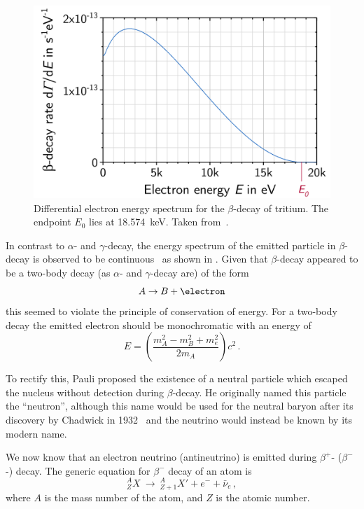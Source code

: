 \begin{figure}[h]
  \centering
  \includegraphics[width=.7\linewidth]{files/figures/theory/betaDecaySpectrum}
  \caption[Differential electron energy spectrum for the $\beta$-decay of tritium.]{Differential electron energy spectrum for the $\beta$-decay of tritium. The endpoint $E_{0}$ lies at 18.574~keV. Taken from~\cite{betaDecay}.}
  \label{fig:betaDecay}
\end{figure}

In contrast to $\alpha$- and $\gamma$-decay, the energy spectrum of the emitted particle in $\beta$-decay is observed to be continuous~\cite{ideaOfNeutrino} as shown in .
Given that $\beta$-decay appeared to be a two-body decay (as $\alpha$- and $\gamma$-decay are) of the form
\begin{equation}
  A \rightarrow B + \electron
\end{equation}
this seemed to violate the principle of conservation of energy.
For a two-body decay the emitted electron should be monochromatic with an energy of
\begin{equation}
  E = \left( \frac{m_{A}^{2} - m_{B}^{2} + m_{e}^{2}}{2 m_{A}} \right)c^{2} \, .
\end{equation}

To rectify this, Pauli proposed the existence of a neutral particle which escaped the nucleus without detection during $\beta$-decay.
He originally named this particle the ``neutron'', although this name would be used for the neutral baryon after its discovery by Chadwick in 1932~\cite{neutronDiscovery} and the neutrino would instead be known by its modern name.

We now know that an electron neutrino (antineutrino) is emitted during $\beta^{+}$- ($\beta^{-}$-) decay. The generic equation for $\beta^{-}$ decay of an atom is
\begin{equation}
  ^{A}_{Z}X~\rightarrow~^{A}_{Z+1}X' + e^{-} + \bar{\nu}_{e} \,,
\end{equation}
where $A$ is the mass number of the atom, and $Z$ is the atomic number. 


